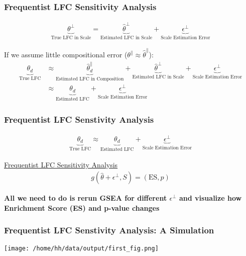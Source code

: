\documentclass[11pt,t]{beamer}
\begin{document}
\begin{frame}
  \frametitle{Frequentist LFC Sensitivity Analysis}
  \begin{align*}
    \underbrace{\theta^\perp}_{\text{True LFC in Scale}} = \underbrace{\hat{\theta}^\perp}_{\text{Estimated LFC in Scale}} + \underbrace{\epsilon^\perp}_{\text{Scale Estimation Error}}
  \end{align*}

  If we assume little compositional error (\(\theta^\parallel \approx \hat{\theta}^\parallel\)):
  \begin{align*}
    \underbrace{\theta_d}_{\text{True LFC}} &\approx \underbrace{\hat{\theta}^\parallel_d}_{\text{Estimated LFC in Composition}} + \underbrace{\hat{\theta}^\perp}_{\text{Estimated LFC in Scale}} + \underbrace{\epsilon^\perp}_{\text{Scale Estimation Error}} \\
                                        &\approx \underbrace{\theta_d}_{\text{Estimated LFC}} + \underbrace{\epsilon^\perp}_{\text{Scale Estimation Error}}
  \end{align*}
\end{frame}

\begin{frame}
  \frametitle{Frequentist LFC Senstivity Analysis}
  \begin{align*}
    \underbrace{\theta_d}_{\text{True LFC}} \approx \underbrace{\theta_d}_{\text{Estimated LFC}} + \underbrace{\epsilon^\perp}_{\text{Scale Estimation Error}}
  \end{align*}

  \underline{Frequentist LFC Sensitivity Analysis}
  \begin{align*}
    g(\hat{\theta}+\epsilon^\perp, S) = (\text{ES}, p)
  \end{align*}

  \textbf{All we need to do is rerun GSEA for different \(\epsilon^\perp\) and visualize how Enrichment Score (ES) and p-value changes}
  
\end{frame}

\begin{frame}
  \frametitle{Frequentist LFC Senstivity Analysis: A Simulation}

  \begin{center}
    \texttt{[image: /home/hh/data/output/first\_fig.png]}
  \end{center}
\end{frame}
\end{document}
